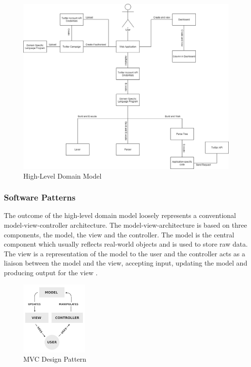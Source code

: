 \begin{figure}[H]
  \centering
  \includegraphics[width=1\textwidth]{images/high-level-domain.png}
  \caption{High-Level Domain Model}
\end{figure}

\subsubsection{Software Patterns}

The outcome of the high-level domain model loosely represents a conventional model-view-controller architecture. The model-view-architecture is based on three components, the model, the view and the controller. The model is the central component which usually reflects real-world objects and is used to store raw data. The view is a representation of the model to the user and the controller acts as a liaison between the model and the view, accepting input, updating the model and producing output for the view \cite{deacon2009model}. 

\begin{figure}[H]
  \centering
  \includegraphics[width=0.3\textwidth]{images/mvc.png}
  \caption{MVC Design Pattern \cite{mvc}}
\end{figure}


